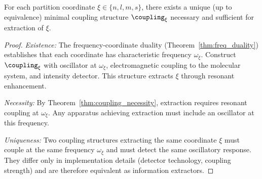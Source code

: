 \begin{theorem}
\label{thm:instrument_necessity}
For each partition coordinate $\xi \in \{n, l, m, s\}$, there exists a unique (up to equivalence) minimal coupling structure $\coupling_\xi$ necessary and sufficient for extraction of $\xi$.
\end{theorem}

\begin{proof}
\textit{Existence:} The frequency-coordinate duality (Theorem~\ref{thm:freq_duality}) establishes that each coordinate has characteristic frequency $\omega_\xi$. Construct $\coupling_\xi$ with oscillator at $\omega_\xi$, electromagnetic coupling to the molecular system, and intensity detector. This structure extracts $\xi$ through resonant enhancement.

\textit{Necessity:} By Theorem~\ref{thm:coupling_necessity}, extraction requires resonant coupling at $\omega_\xi$. Any apparatus achieving extraction must include an oscillator at this frequency.

\textit{Uniqueness:} Two coupling structures extracting the same coordinate $\xi$ must couple at the same frequency $\omega_\xi$ and must detect the same oscillatory response. They differ only in implementation details (detector technology, coupling strength) and are therefore equivalent as information extractors.
\end{proof}

